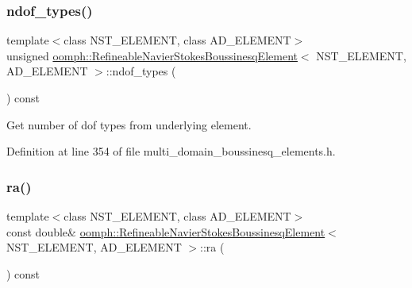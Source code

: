 \mbox{\label{classoomph_1_1RefineableNavierStokesBoussinesqElement_a8e494f3887499d79d8c30c7434494b47}} 
\subsubsection{\texorpdfstring{ndof\+\_\+types()}{ndof\_types()}}
{\footnotesize\ttfamily template$<$class N\+S\+T\+\_\+\+E\+L\+E\+M\+E\+NT, class A\+D\+\_\+\+E\+L\+E\+M\+E\+NT$>$ \\
unsigned \hyperlink{classoomph_1_1RefineableNavierStokesBoussinesqElement}{oomph\+::\+Refineable\+Navier\+Stokes\+Boussinesq\+Element}$<$ N\+S\+T\+\_\+\+E\+L\+E\+M\+E\+NT, A\+D\+\_\+\+E\+L\+E\+M\+E\+NT $>$\+::ndof\+\_\+types (\begin{DoxyParamCaption}{ }\end{DoxyParamCaption}) const\hspace{0.3cm}{\ttfamily [inline]}}



Get number of dof types from underlying element. 



Definition at line 354 of file multi\+\_\+domain\+\_\+boussinesq\+\_\+elements.\+h.

\mbox{\label{classoomph_1_1RefineableNavierStokesBoussinesqElement_ae18350ad83634633acea59b60123d3c0}} 
\subsubsection{\texorpdfstring{ra()}{ra()}}
{\footnotesize\ttfamily template$<$class N\+S\+T\+\_\+\+E\+L\+E\+M\+E\+NT, class A\+D\+\_\+\+E\+L\+E\+M\+E\+NT$>$ \\
const double\& \hyperlink{classoomph_1_1RefineableNavierStokesBoussinesqElement}{oomph\+::\+Refineable\+Navier\+Stokes\+Boussinesq\+Element}$<$ N\+S\+T\+\_\+\+E\+L\+E\+M\+E\+NT, A\+D\+\_\+\+E\+L\+E\+M\+E\+NT $>$\+::ra (\begin{DoxyParamCaption}{ }\end{DoxyParamCaption}) const\hspace{0.3cm}{\ttfamily [inline]}}



